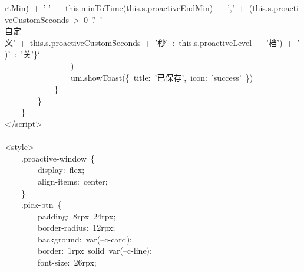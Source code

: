 \documentclass[a4paper,10pt]{article}
\begin{document}
{rtMin)~+~'-'~+~this.minToTime(this.s.proactiveEndMin)~+~','~+~(this.s.proactiveCustomSeconds~>~0~?~'\\
自定义'~+~this.s.proactiveCustomSeconds~+~'秒'~:~this.s.proactiveLevel~+~'档')~+~')'~:~'关'\}`\\
~~~~~~~~~~~~~~~~)\\
~~~~~~~~~~~~~~~~uni.showToast(\{~title:~'已保存',~icon:~'success'~\})\\
~~~~~~~~~~~~\}\\
~~~~~~~~\}\\
~~~~\}\\
</script>\\
\mbox{}\\
<style>\\
~~~~.proactive-window~\{\\
~~~~~~~~display:~flex;\\
~~~~~~~~align-items:~center;\\
~~~~\}\\
~~~~.pick-btn~\{\\
~~~~~~~~padding:~8rpx~24rpx;\\
~~~~~~~~border-radius:~12rpx;\\
~~~~~~~~background:~var(--c-card);\\
~~~~~~~~border:~1rpx~solid~var(--c-line);\\
~~~~~~~~font-size:~26rpx;
}

\newpage
\end{document}
